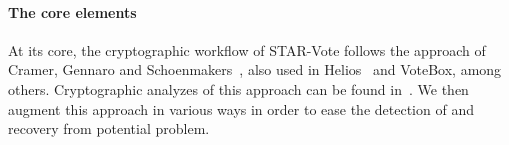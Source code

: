 \label{sec:crypto}



\paragraph{The core elements}
\label{sec:crypto-core}


\newcommand{\Ext}{\ensuremath{Ext}\xspace}

At its core, the cryptographic workflow of STAR-Vote follows the
approach of Cramer, Gennaro and Schoenmakers~\cite{CGS97}, also used
in Helios~\cite{adida09helios} and VoteBox\cite{sandler08votebox},
among others. Cryptographic analyzes of this approach can be found
in~\cite{BPW12,CGGI13}. We then augment this approach in various ways
in order to ease the detection of and recovery from potential problem.   

